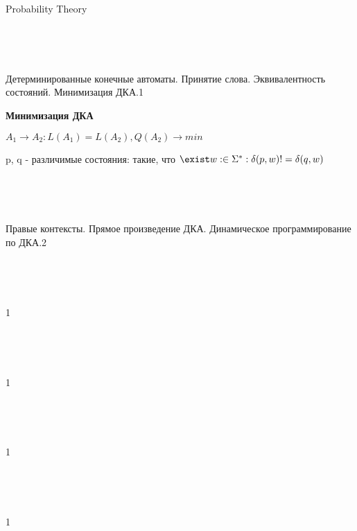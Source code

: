 \documentclass{article}
\begin{document}
\begin{center}

\Huge Probability Theory

\end{center}

~\

~\

\begin{question}{Детерминированные конечные автоматы. Принятие слова. Эквивалентность состояний. Минимизация ДКА.}{1}

\textbf{Минимизация ДКА}

$A_1 \rightarrow A_2 : L(A_1) = L(A_2), Q(A_2) \rightarrow min$

p, q - различимые состояния: такие, что $\exist w : \in \Sigma^* : \delta(p, w) != \delta(q, w)$

\end{question}

~\

~\

\begin{question}{Правые контексты. Прямое произведение ДКА. Динамическое программирование по ДКА.}{2}



\end{question}

~\

~\

\begin{question}{}{1}



\end{question}

~\

~\

\begin{question}{}{1}



\end{question}

~\

~\

\begin{question}{}{1}



\end{question}

~\

~\

\begin{question}{}{1}



\end{question}
\end{document}
